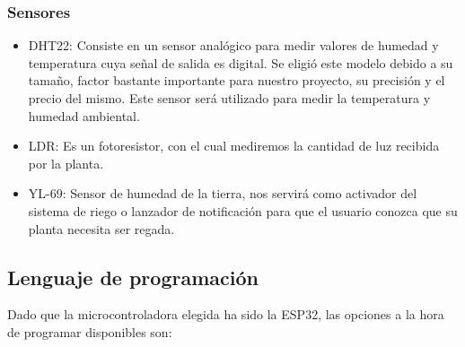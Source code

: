 \documentclass[runningheads]{llncs}
\begin{document}
\subsubsection*{Sensores}
\begin{itemize}
    \item DHT22: Consiste en un sensor analógico para medir valores de humedad y temperatura cuya señal de salida es digital.  Se eligió este modelo debido a su tamaño, factor bastante importante para nuestro proyecto, su precisión y el precio del mismo. \newline Este sensor será utilizado para medir la temperatura y humedad ambiental.
    \item LDR: Es un fotoresistor, con el cual mediremos la cantidad de luz recibida por la planta.
    \item YL-69: Sensor de humedad de la tierra, nos servirá como activador del sistema de riego o lanzador de notificación para que el usuario conozca que su planta necesita ser regada.
\end{itemize}

\subsection*{Lenguaje de programación}

Dado que la microcontroladora elegida ha sido la ESP32, las opciones a la hora de programar disponibles son:
\end{document}

